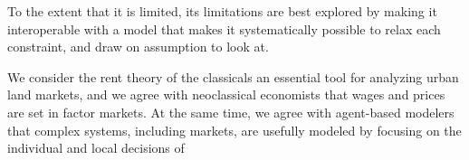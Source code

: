 {To the extent that it is limited, its limitations are best explored by making it interoperable with a model that makes it systematically possible to relax each constraint, and draw on assumption to look at.


We consider the rent theory of the classicals an essential tool for analyzing urban land markets, and we agree with neoclassical economists that wages and prices are set in factor markets. At the same time, we agree with agent-based modelers that complex systems, including markets, are usefully modeled by focusing on the individual and local decisions of %













}
